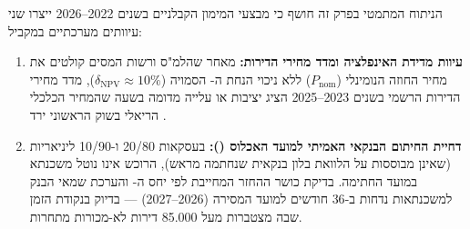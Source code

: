\begin{warningbox}
הניתוח המתמטי בפרק זה חושף כי מבצעי המימון הקבלניים בשנים \num{2022}--\num{2026} ייצרו שני עיוותים מערכתיים במקביל:
\begin{enumerate}[label=\textbf{\arabic*.},rightmargin=0.5cm]
  \item \textbf{עיוות מדידת האינפלציה ומדד מחירי הדירות:} מאחר שהלמ"ס ורשות המסים קולטים את מחיר החוזה הנומינלי ($P_{\text{nom}}$) ללא ניכוי הנחת ה- הסמויה ($\delta_{\text{NPV}} \approx 10\%$), מדד מחירי הדירות הרשמי בשנים \num{2023}--\num{2025} הציג יציבות או עלייה מדומה בשעה שהמחיר הכלכלי הריאלי בשוק הראשוני ירד \cite{mof2025economist,ita2025carman}.
  \item \textbf{דחיית החיתום הבנקאי האמיתי למועד האכלוס ():} בעסקאות \num{20/80} ו-\num{10/90} ליניאריות (שאינן מבוססות על הלוואת בלון בנקאית שנחתמה מראש), הרוכש אינו נוטל משכנתא במועד החתימה. בדיקת כושר ההחזר המחייבת לפי יחס ה- והערכת שמאי הבנק למשכנתאות נדחות ב-\num{36} חודשים למועד המסירה (\num{2026}--\num{2027}) — בדיוק בנקודת הזמן שבה מצטברות מעל \num{85,000} דירות לא-מכורות מתחרות.
\end{enumerate}
\end{warningbox}
